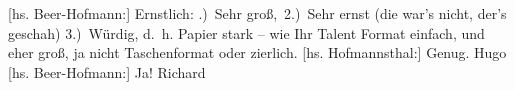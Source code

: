 \begin{ledgroupsized}[t]{13cm}
           \pstart
           {[}hs. Beer-Hofmann:{]} Ernstlich:\pend
           \settowidth{\longeste}{3) Ausstattung}\settowidth{\longestz}{entscheiden}\settowidth{\longestd}{}\settowidth{\longestv}{}\settowidth{\longestf}{}\addtolength\longeste{1em}
        \addtolength\longestz{1em}
      \pstart\noindent{}\makebox[\the\longestz][l]{}
                  \pend\pstart\noindent{}
                  \pend\pstart\noindent{}\makebox[\the\longestz][l]{}
                  \pend{}.) Sehr groß, 2.) Sehr ernst (die war’s nicht, der’s geschah) 3.) Würdig, d. h.
               Papier stark – wie Ihr Talent Format einfach, und eher groß, ja nicht Taschenformat
               oder zierlich.\pend
           \pstart
           {[}hs. Hofmannsthal:{]} Genug. \spacefill\mbox{Hugo}\pend
           \pstart
           {[}hs. Beer-Hofmann:{]} Ja! \spacefill\mbox{Richard}\pend
           \pstart
           \noindent{}\label{T_L01269_1v}\label{T_L01269_1h}\pend
                     \endnumbering{}\end{ledgroupsized}  \newcommand{\dateiname}{L01269}\newcommand{\titel}{Hugo von Hofmannsthal und Richard Beer-Hofmann an Arthur Schnitzler, [15.? 2. 1903]}\newcommand{\editorInnen}{Martin Anton Müller und Gerd-Hermann Susen}
            \footnotesize
\begin{ledgroupsized}[t]{11.5cm}
\end{ledgroupsized}
         
      